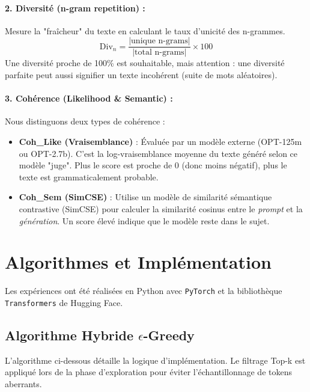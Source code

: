 \documentclass[12pt,a4paper]{article}
\begin{document}
\paragraph{2. Diversit\'e (n-gram repetition) :}
Mesure la "fra\^icheur" du texte en calculant le taux d'unicit\'e des n-grammes.
\begin{equation}
    \text{Div}_n = \frac{|\text{unique n-grams}|}{|\text{total n-grams}|} \times 100
\end{equation}
Une diversit\'e proche de 100\% est souhaitable, mais attention : une diversit\'e parfaite peut aussi signifier un texte incoh\'erent (suite de mots al\'eatoires).

\paragraph{3. Coh\'erence (Likelihood \& Semantic) :}
Nous distinguons deux types de coh\'erence :
\begin{itemize}
    \item \textbf{Coh\_Like (Vraisemblance)} : \'Evalu\'ee par un mod\`ele externe (OPT-125m ou OPT-2.7b). C'est la log-vraisemblance moyenne du texte g\'en\'er\'e selon ce mod\`ele "juge". Plus le score est proche de 0 (donc moins n\'egatif), plus le texte est grammaticalement probable.
    \item \textbf{Coh\_Sem (SimCSE)} : Utilise un mod\`ele de similarit\'e s\'emantique contrastive (SimCSE) pour calculer la similarit\'e cosinus entre le \textit{prompt} et la \textit{g\'en\'eration}. Un score \'elev\'e indique que le mod\`ele reste dans le sujet.
\end{itemize}

\section{Algorithmes et Implémentation}

Les expériences ont été réalisées en Python avec \texttt{PyTorch} et la bibliothèque \texttt{Transformers} de Hugging Face.

\subsection{Algorithme Hybride $\epsilon$-Greedy}
L'algorithme ci-dessous détaille la logique d'implémentation. Le filtrage Top-k est appliqué lors de la phase d'exploration pour éviter l'échantillonnage de tokens aberrants.
\end{document}
